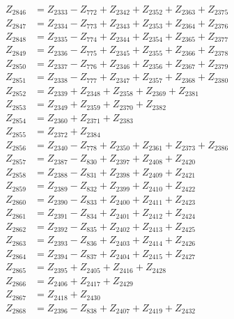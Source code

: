 \begin{multicols}{2}
\begin{align}
Z_{2846} &= Z_{2333} - Z_{772} + Z_{2342} + Z_{2352} + Z_{2363} + Z_{2375} \nonumber \\
Z_{2847} &= Z_{2334} - Z_{773} + Z_{2343} + Z_{2353} + Z_{2364} + Z_{2376} \nonumber \\
Z_{2848} &= Z_{2335} - Z_{774} + Z_{2344} + Z_{2354} + Z_{2365} + Z_{2377} \nonumber \\
Z_{2849} &= Z_{2336} - Z_{775} + Z_{2345} + Z_{2355} + Z_{2366} + Z_{2378} \nonumber \\
Z_{2850} &= Z_{2337} - Z_{776} + Z_{2346} + Z_{2356} + Z_{2367} + Z_{2379} \nonumber \\
Z_{2851} &= Z_{2338} - Z_{777} + Z_{2347} + Z_{2357} + Z_{2368} + Z_{2380} \nonumber \\
Z_{2852} &= Z_{2339} + Z_{2348} + Z_{2358} + Z_{2369} + Z_{2381} \nonumber \\
Z_{2853} &= Z_{2349} + Z_{2359} + Z_{2370} + Z_{2382} \nonumber \\
Z_{2854} &= Z_{2360} + Z_{2371} + Z_{2383} \nonumber \\
Z_{2855} &= Z_{2372} + Z_{2384} \nonumber \\
Z_{2856} &= Z_{2340} - Z_{778} + Z_{2350} + Z_{2361} + Z_{2373} + Z_{2386} \nonumber \\
Z_{2857} &= Z_{2387} - Z_{830} + Z_{2397} + Z_{2408} + Z_{2420} \nonumber \\
Z_{2858} &= Z_{2388} - Z_{831} + Z_{2398} + Z_{2409} + Z_{2421} \nonumber \\
Z_{2859} &= Z_{2389} - Z_{832} + Z_{2399} + Z_{2410} + Z_{2422} \nonumber \\
Z_{2860} &= Z_{2390} - Z_{833} + Z_{2400} + Z_{2411} + Z_{2423} \nonumber \\
Z_{2861} &= Z_{2391} - Z_{834} + Z_{2401} + Z_{2412} + Z_{2424} \nonumber \\
Z_{2862} &= Z_{2392} - Z_{835} + Z_{2402} + Z_{2413} + Z_{2425} \nonumber \\
Z_{2863} &= Z_{2393} - Z_{836} + Z_{2403} + Z_{2414} + Z_{2426} \nonumber \\
Z_{2864} &= Z_{2394} - Z_{837} + Z_{2404} + Z_{2415} + Z_{2427} \nonumber \\
Z_{2865} &= Z_{2395} + Z_{2405} + Z_{2416} + Z_{2428} \nonumber \\
Z_{2866} &= Z_{2406} + Z_{2417} + Z_{2429} \nonumber \\
Z_{2867} &= Z_{2418} + Z_{2430} \nonumber \\
Z_{2868} &= Z_{2396} - Z_{838} + Z_{2407} + Z_{2419} + Z_{2432} \nonumber \\

\end{align}
\end{multicols}
